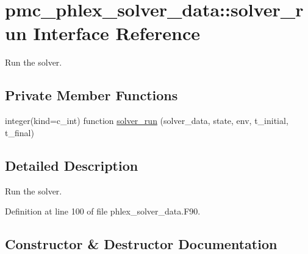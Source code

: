 \hypertarget{interfacepmc__phlex__solver__data_1_1solver__run}{}\section{pmc\+\_\+phlex\+\_\+solver\+\_\+data\+:\+:solver\+\_\+run Interface Reference}
\label{interfacepmc__phlex__solver__data_1_1solver__run}


Run the solver.  


\subsection*{Private Member Functions}
\begin{DoxyCompactItemize}
\item 
integer(kind=c\+\_\+int) function \mbox{\hyperlink{interfacepmc__phlex__solver__data_1_1solver__run_acb533e40d350699a3b74e4a56f0f8ca6}{solver\+\_\+run}} (solver\+\_\+data, state, env, t\+\_\+initial, t\+\_\+final)
\end{DoxyCompactItemize}


\subsection{Detailed Description}
Run the solver. 

Definition at line 100 of file phlex\+\_\+solver\+\_\+data.\+F90.



\subsection{Constructor \& Destructor Documentation}
\mbox{\label{interfacepmc__phlex__solver__data_1_1solver__run_acb533e40d350699a3b74e4a56f0f8ca6}} 
